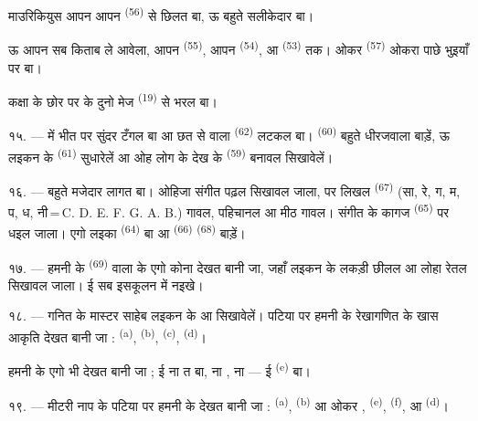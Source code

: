 माउरिकियुस आपन  आपन  \textsuperscript{(56)}
से छिलत बा, ऊ बहुते सलीकेदार बा।

ऊ आपन सब किताब ले आवेला, आपन  \textsuperscript{(55)},
आपन  \textsuperscript{(54)}, आ 
\textsuperscript{(53)} तक। ओकर  \textsuperscript{(57)}
ओकरा पाछे भुइयाँ पर बा।

कक्षा के छोर पर के दुनो मेज  \textsuperscript{(19)} से
भरल बा।

\VUsaut{4.6mm}
\VUsaut{3.4mm}

१५. ---  में भीत पर सुंदर 
टँगल बा आ छत से  वाला  \textsuperscript{(62)}
लटकल बा।  \textsuperscript{(60)} बहुते धीरजवाला
बाड़ें, ऊ लइकन के  \textsuperscript{(61)} सुधारेलें आ ओह लोग
के देख के  \textsuperscript{(59)} बनावल सिखावेलें।

१६. ---  बहुते मजेदार लागत बा। ओहिजा संगीत
पढ़ल सिखावल जाला,  पर लिखल 
\textsuperscript{(67)} (सा, रे, ग, म, प, ध, नी\,=\,C. D. E. F. G. A. B.)
गावल,  पहिचानल आ मीठ  गावल। संगीत के कागज
 \textsuperscript{(65)} पर धइल जाला। एगो लइका
 \textsuperscript{(64)} बा आ  \textsuperscript{(66)}  \textsuperscript{(68)}
बाड़ें।

१७. --- हमनी के  \textsuperscript{(69)} वाला
 के एगो कोना देखत बानी जा, जहाँ लइकन के लकड़ी छीलल आ
लोहा रेतल सिखावल जाला। ई सब इसकूलन में नइखे।

\VUsaut{5.0mm}
\VUsaut{3.6mm}

१८. --- गनित के मास्टर साहेब लइकन के  आ  सिखावेलें। पटिया पर हमनी के रेखागणित के
खास आकृति देखत बानी जा :  \textsuperscript{(a)},
 \textsuperscript{(b)},  \textsuperscript{(c)},
 \textsuperscript{(d)}।

हमनी के एगो  भी देखत बानी जा ; ई ना त  बा, ना
, ना  — ई  \textsuperscript{(e)} बा।

१९. --- मीटरी नाप के पटिया पर हमनी के देखत बानी जा : 
\textsuperscript{(a)},  \textsuperscript{(b)} आ ओकर
,  \textsuperscript{(e)}, 
\textsuperscript{(f)},  आ 
\textsuperscript{(d)}।

